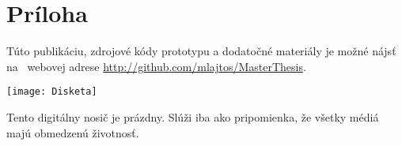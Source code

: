 \chapter{Príloha}

Túto publikáciu, zdrojové kódy prototypu a dodatočné materiály je možné nájsť na~ webovej adrese \url{http://github.com/mlajtos/MasterThesis}.

\vfill

\begin{center}
  \texttt{[image: Disketa]}  
\end{center}

\vfill

Tento digitálny nosič je prázdny. Slúži iba ako pripomienka, že všetky médiá majú obmedzenú životnosť.

\vfill